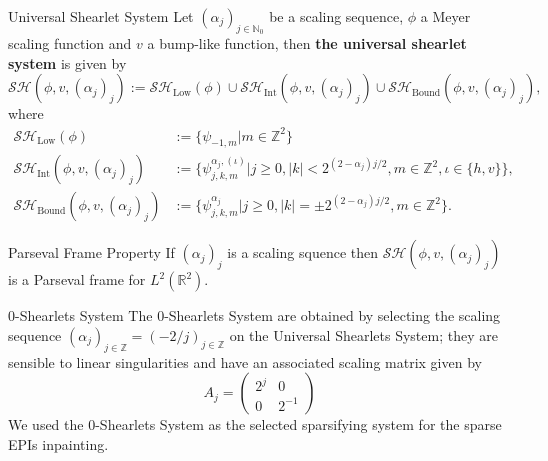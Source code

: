 \begin{frame}
\begin{block}{Universal Shearlet System}
Let $(\alpha_j)_{j\in \mathbb{N}_0}$ be a scaling sequence, $\phi$ a Meyer scaling function and $v$ a bump-like function, then \textbf{the universal shearlet system} is given by
$$
\mathcal{SH}(\phi,v,(\alpha_j)_j):=\mathcal{SH}_{\text{Low}}(\phi)\cup\mathcal{SH}_{\text{Int}}(\phi,v,(\alpha_j)_j)\cup\mathcal{SH}_{\text{Bound}}(\phi,v,(\alpha_j)_j),
$$
where
$$
\begin{aligned}
\mathcal{SH}_{\text{Low}}(\phi)&:=\{\psi_{-1,m}|m\in\mathbb{Z}^2\}\\
\mathcal{SH}_{\text{Int}}(\phi,v,(\alpha_j)_j)&:=\{\psi_{j,k,m}^{\alpha_j,(\iota)}|j\geq 0,|k|< 2^{(2-\alpha_j)j/2},m\in\mathbb{Z}^2,\iota\in\{h,v\}\},\\
\mathcal{SH}_{\text{Bound}}(\phi,v,(\alpha_j)_j)&:=\{\psi_{j,k,m}^{\alpha_j}|j\geq 0,|k|=\pm 2^{(2-\alpha_j)j/2},m\in\mathbb{Z}^2\}.
\end{aligned}
$$
\end{block}

\begin{block}{Parseval Frame Property}
If $(\alpha_j)_j$ is a scaling squence then $\mathcal{SH}(\phi,v,(\alpha_j)_j)$ is a Parseval frame for $L^2(\mathbb{R}^2)$.
\end{block}
\end{frame}

\begin{frame}
\begin{block}{$0$-Shearlets System}
The $0$-Shearlets System are obtained by selecting the scaling sequence $(\alpha_j)_{j\in\mathbb{Z}}=(-2/j)_{j\in\mathbb{Z}}$ on the Universal Shearlets System; they are sensible to linear singularities and have an associated scaling matrix given by
$$
A_j =\left(\begin{matrix} 2^j & 0 \\ 0 & 2^{-1} \end{matrix}\right)
$$
We used the $0$-Shearlets System as the selected sparsifying system for the sparse EPIs inpainting.
\end{block}
\end{frame}


